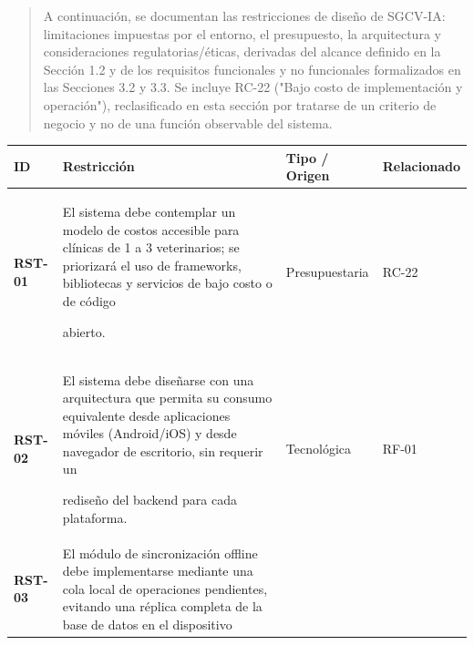 \documentclass[
]{article}
\newcounter{none} %
\begin{document}
\begin{quote}
A continuación, se documentan las restricciones de diseño de SGCV-IA:
limitaciones impuestas por el entorno, el presupuesto, la arquitectura y
consideraciones regulatorias/éticas, derivadas del alcance definido en
la Sección 1.2 y de los requisitos funcionales y no funcionales
formalizados en las Secciones 3.2 y 3.3. Se incluye RC-22 ("Bajo costo
de implementación y operación"), reclasificado en esta sección por
tratarse de un criterio de negocio y no de una función observable del
sistema.
\end{quote}

{\def\LTcaptype{none} %
\begin{longtable}[]{@{}
  >{\raggedright\arraybackslash}p{}
  >{\raggedright\arraybackslash}p{}
  >{\raggedright\arraybackslash}p{}
  >{\raggedright\arraybackslash}p{}@{}}
\toprule\noalign{}
\begin{minipage}[b]{\linewidth}\raggedright
\textbf{ID}
\end{minipage} & \begin{minipage}[b]{\linewidth}\raggedright
\textbf{Restricción}
\end{minipage} & \begin{minipage}[b]{\linewidth}\raggedright
\textbf{Tipo / Origen}
\end{minipage} & \begin{minipage}[b]{\linewidth}\raggedright
\textbf{Relacionado}
\end{minipage} \\
\midrule\noalign{}
\endhead
\bottomrule\noalign{}
\endlastfoot
\textbf{RST-01} & El sistema debe contemplar un modelo de costos
accesible para clínicas de 1 a 3 veterinarios; se priorizará el uso de
frameworks, bibliotecas y servicios de bajo costo o de código

abierto. & Presupuestaria & RC-22 \\
\textbf{RST-02} & El sistema debe diseñarse con una arquitectura que
permita su consumo equivalente desde aplicaciones móviles (Android/iOS)
y desde navegador de escritorio, sin requerir un

rediseño del backend para cada plataforma. & Tecnológica & RF-01 \\
\textbf{RST-03} & El módulo de sincronización offline debe implementarse
mediante una cola local de operaciones pendientes, evitando una réplica
completa de la base de datos en el dispositivo


\end{longtable}}
\end{document}
